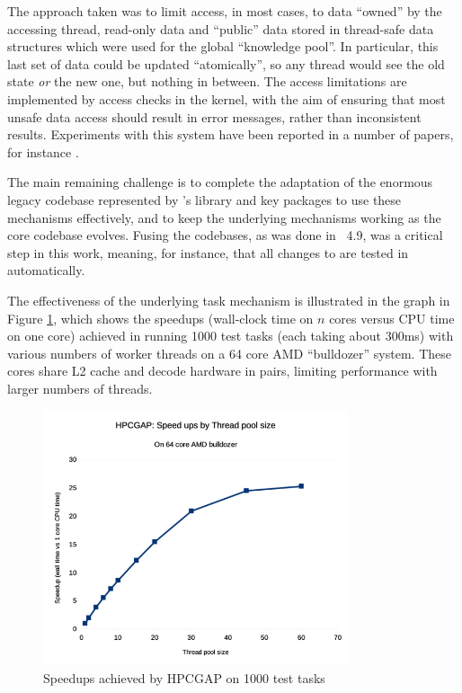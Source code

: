 The approach taken was to limit access, in most cases, to
data ``owned'' by the accessing thread, read-only data and ``public''
data stored in thread-safe data structures which were used for the
global ``knowledge pool''. In particular, this last set of data could
be updated ``atomically'', so any thread would see the old state
\emph{or} the new one, but nothing in between. The access limitations are implemented by
access checks in the kernel, with the aim of ensuring that most unsafe
data access should result in error messages, rather than inconsistent
results. Experiments with this system have been reported in a number
of papers, for instance \cite{HPCGAP-paper}.

The main remaining challenge is to complete the adaptation of the
enormous legacy codebase represented by \GAP's library and key
packages to use these mechanisms effectively, and to keep the
underlying mechanisms working as the core \GAP codebase
evolves. Fusing the codebases, as was done in \GAP~4.9, was a critical
step in this work, meaning, for instance, that all changes to \GAP are
tested in \HPCGAP automatically.

The effectiveness of the underlying task mechanism is illustrated in
the graph in Figure \ref{fig:hpcgap-speedups}, which shows the speedups (wall-clock time on $n$
cores versus CPU time on one core) achieved in running 1000 test tasks
(each taking about 300ms) with various numbers of worker threads on a 64
core AMD ``bulldozer'' system. These cores share L2 cache and decode
hardware in pairs, limiting performance with larger numbers of
threads.

\begin{figure}[!ht]
    \centering
    \includegraphics[width=0.8\textwidth]{images/hpcgap-speedups}
    \caption{Speedups achieved by HPCGAP on 1000 test tasks}\label{fig:hpcgap-speedups}
\end{figure}


